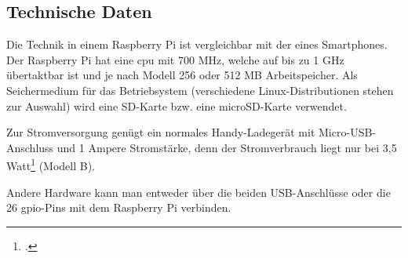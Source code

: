 \subsection{Technische Daten}
Die Technik in einem Raspberry Pi ist vergleichbar mit der eines Smartphones. Der Raspberry Pi hat eine \acrshort{cpu} mit 700 MHz, welche auf bis zu 1 GHz übertaktbar ist und je nach Modell 256 oder 512 MB Arbeitspeicher. Als Seichermedium für das Betriebsystem (verschiedene Linux-Distributionen stehen zur Auswahl) wird eine SD-Karte bzw. eine microSD-Karte verwendet.

Zur Stromversorgung genügt ein normales Handy-Ladegerät mit Micro-USB-Anschluss und 1 \gls{Ampere} Stromstärke, denn der Stromverbrauch liegt nur bei 3,5 Watt\footcite{strom} (Modell B).

Andere Hardware kann man entweder über die beiden USB-Anschlüsse oder die 26 \gls{gpio}-Pins mit dem Raspberry Pi verbinden.



